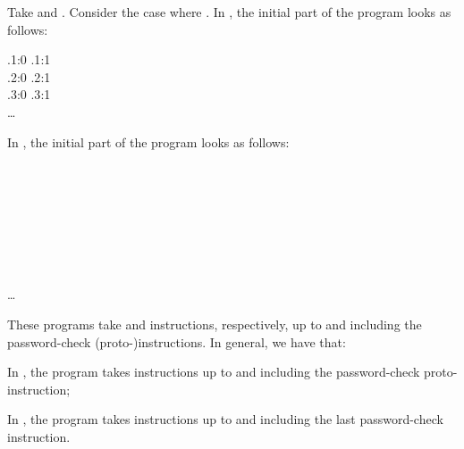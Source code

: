 \documentclass[fleqn]{llncs}
\begin{document}
\begin{example}
Take  and .
Consider the case where .
In \PGLDdii, the initial part of the program looks as follows:
\begin{ldispl}
 \conc {} \conc
\rfdt.\setr{:}1{:}0 \conc {} \conc \rfdt.\setr{:}1{:}1 \conc {} \\
 \conc {} \conc
\rfdt.\setr{:}2{:}0 \conc {} \conc \rfdt.\setr{:}2{:}1 \conc {} \\
 \conc {} \conc
\rfdt.\setr{:}3{:}0 \conc {} \conc \rfdt.\setr{:}3{:}1 \conc {} \\
 \conc \ldots
\end{ldispl}In \PGLD, the initial part of the program looks as follows:
\begin{ldispl}
 \conc {} \conc {} \conc {} \\
 \conc {} \conc {} \conc
{} \conc {} \conc {} \conc {} \\
 \conc {} \conc {} \conc
{} \conc {} \conc {} \conc {} \\
 \conc {} \conc {} \conc
{} \conc {} \conc {} \conc {} \\
 \conc {} \conc {} \conc
{} \conc {} \conc {} \conc {} \\
 \conc {} \conc {} \conc
{} \conc {} \conc {} \conc {} \\
 \conc {} \conc {} \conc
{} \conc {} \conc {} \conc {} \\
 \conc {} \conc {} \conc
{} \conc \ldots
\end{ldispl}These programs take  and  instructions, respectively, up to and
including the password-check \mbox{(proto-)}instructions.
In general, we have that:
\begin{iteml}
\item
In \PGLDdii, the program takes  instructions up to and
including the password-check proto-instruction;
\item
In \PGLD, the program takes  instructions up to
and including the last password-check instruction.
\end{iteml}
\end{example}
\end{document}
